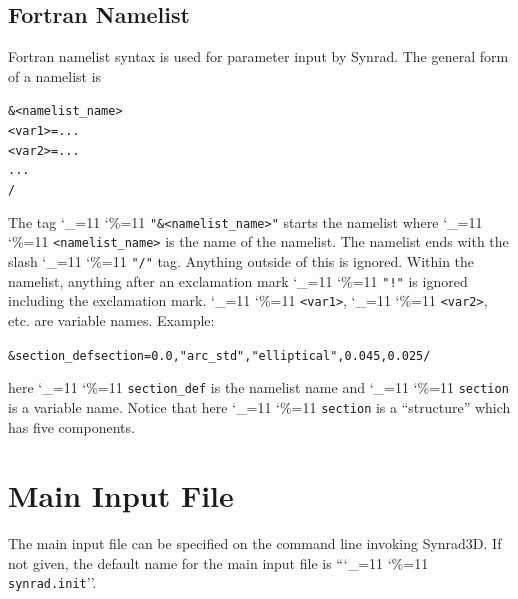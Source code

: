 \documentclass[11pt]{article}
\newcommand\ttcmd{\begingroup\catcode`\_=11 \catcode`\%=11 \dottcmd}
\newcommand\dottcmd[1]{\texttt{#1}\endgroup}
\newcommand{\vn}{\ttcmd}
\newenvironment{example}
  {\vspace{-3.0ex} \begin{alltt}}
  {\end{alltt} \vspace{-2.5ex}}
\begin{document}
\subsection{Fortran Namelist}
\label{s:namelist}

Fortran namelist syntax is used for parameter input by Synrad. The
general form of a namelist is
\begin{example}
  &<namelist_name>
    <var1> = ...
    <var2> = ...
    ...
  /
\end{example}
The tag \vn{"\&<namelist_name>"} starts the namelist where
\vn{<namelist_name>} is the name of the namelist. The namelist ends
with the slash \vn{"/"} tag. Anything outside of this is
ignored. Within the namelist, anything after an exclamation mark
\vn{"!"} is ignored including the exclamation mark. \vn{<var1>},
\vn{<var2>}, etc. are variable names. Example:
\begin{example}
  &section_def section =   0.0, "arc_std", "elliptical", 0.045, 0.025 /
\end{example}
here \vn{section_def} is the namelist name and \vn{section} is a variable
name.  Notice that here \vn{section} is a ``structure'' which has five
components.

\section{Main Input File} 

The main input file can be specified on the command line invoking Synrad3D.
If not given, the default name for the main input file is ``\vn{synrad.init}''.
\end{document}
